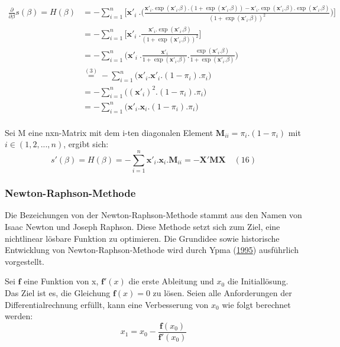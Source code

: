 \documentclass[12pt,]{article}
\begin{document}
\[
\begin{aligned}
\frac{\partial}{\partial \beta} s(\beta) = H(\beta) &= - \sum_{i = 1}^{n} \Bigg[ \mathbf{x'}_i \ . \Bigg( \frac{\mathbf{x'}_i.\exp(\mathbf{x'}_i.\beta).(1+\exp(\mathbf{x'}_i.\beta))-\mathbf{x'}_i.\exp(\mathbf{x'}_i.\beta).\exp(\mathbf{x'}_i.\beta)}{(1+\exp(\mathbf{x'}_i.\beta))^2} \Bigg) \Bigg] \\
&= - \sum_{i = 1}^{n} \Bigg[ \mathbf{x'}_i \ . \frac{\mathbf{x'}_i.\exp(\mathbf{x'}_i.\beta)}{(1+\exp(\mathbf{x'}_i.\beta))^2}  \Bigg] \\
&= - \sum_{i = 1}^{n} \Bigg( \mathbf{x'}_i \ . \frac{\mathbf{x'}_i}{1+\exp(\mathbf{x'}_i.\beta)} . \frac{\exp(\mathbf{x'}_i.\beta)}{1+\exp(\mathbf{x'}_i.\beta)} \Bigg) \\
&\mathrel{\overset{(3)}{=}} - \sum_{i = 1}^{n} \Big( \mathbf{x'}_i . \mathbf{x'}_i . (1-\pi_i) . \pi_i \Big) \\
&= - \sum_{i = 1}^{n} \Big( (\mathbf{x'}_i)^2 . (1-\pi_i) . \pi_i \Big) \\
&= - \sum_{i = 1}^{n} \Big( \mathbf{x'}_i.\mathbf{x}_i . (1-\pi_i) . \pi_i \Big) \quad \\
\end{aligned}
\]

Sei M eine nxn-Matrix mit dem i-ten diagonalen Element
\(\mathbf{M}_{ii} = \pi_i.(1-\pi_i)\) mit \(i \in (1,2,...,n)\), ergibt
sich: \[
s'(\beta) = H(\beta) = - \sum_{i = 1}^{n} \mathbf{x'}_i.\mathbf{x}_i . \mathbf{M}_{ii} = - \mathbf{X}'\mathbf{M}\mathbf{X} \quad (16)
\]

\subsubsection{Newton-Raphson-Methode}\label{newton-raphson-methode}

Die Bezeichungen von der Newton-Raphson-Methode stammt aus den Namen von
Isaac Newton und Joseph Raphson. Diese Methode setzt sich zum Ziel, eine
nichtlinear lösbare Funktion zu optimieren. Die Grundidee sowie
historische Entwicklung von Newton-Raphson-Methode wird durch Ypma
(\protect\hyperlink{ref-ypma1995historical}{1995}) ausführlich
vorgestellt.

Sei \(\mathbf{f}\) eine Funktion von x, \(\mathbf{f'}(x)\) die erste
Ableitung und \(x_0\) die Initiallösung. Das Ziel ist es, die Gleichung
\(\mathbf{f}(x) = 0\) zu lösen. Seien alle Anforderungen der
Differentialrechnung erfüllt, kann eine Verbesserung von \(x_0\) wie
folgt berechnet werden: \[
x_1 = x_0 - \frac{\mathbf{f}(x_0)}{\mathbf{f'}(x_0)}
\]
\end{document}
